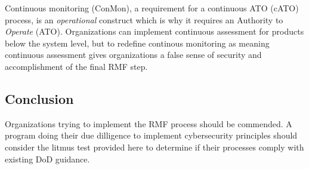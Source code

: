 Continuous monitoring (ConMon), a requirement for a continuous ATO (cATO) process, is an \textit{operational} construct which is why it requires an Authority to \textit{Operate} (ATO). Organizations can implement continuous assessment for products below the system level, but to redefine continous monitoring as meaning continuous assessment gives organizations a false sense of security and accomplishment of the final RMF step.

\subsection{Conclusion}
Organizations trying to implement the RMF process should be commended. A program doing their due dilligence to implement cybersecurity principles should consider the litmus test provided here to determine if their processes comply with existing DoD guidance.
